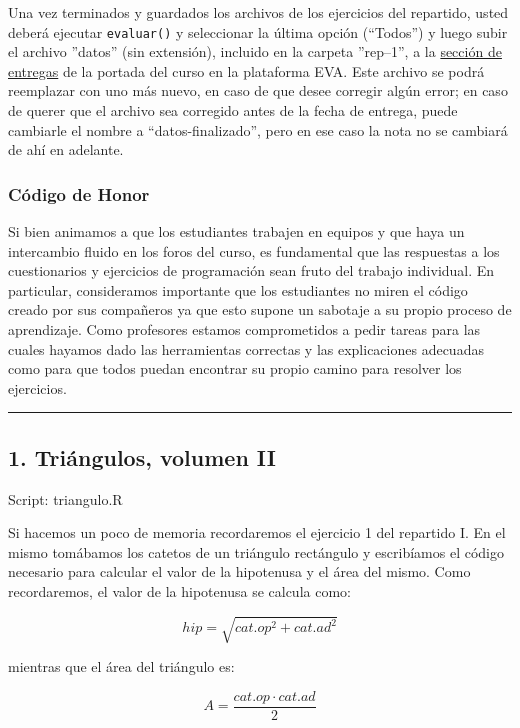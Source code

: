 \documentclass{article}
\begin{document}
Una vez terminados y guardados los archivos de los ejercicios del
repartido, usted deberá ejecutar \verb!evaluar()! y seleccionar la
última opción (``Todos'') y luego subir el archivo ''datos'' (sin
extensión), incluido en la carpeta ''rep--1'', a la
\href{http://eva.universidad.edu.uy/mod/assignment/view.php?id=95125}{sección
de entregas} de la portada del curso en la plataforma EVA. Este archivo
se podrá reemplazar con uno más nuevo, en caso de que desee corregir
algún error; en caso de querer que el archivo sea corregido antes de la
fecha de entrega, puede cambiarle el nombre a ``datos-finalizado'', pero
en ese caso la nota no se cambiará de ahí en adelante.

\subsubsection{Código de Honor}

Si bien animamos a que los estudiantes trabajen en equipos y que haya un
intercambio fluido en los foros del curso, es fundamental que las
respuestas a los cuestionarios y ejercicios de programación sean fruto
del trabajo individual. En particular, consideramos importante que los
estudiantes no miren el código creado por sus compañeros ya que esto
supone un sabotaje a su propio proceso de aprendizaje. Como profesores
estamos comprometidos a pedir tareas para las cuales hayamos dado las
herramientas correctas y las explicaciones adecuadas como para que todos
puedan encontrar su propio camino para resolver los ejercicios.

\begin{center}\rule{3in}{0.4pt}\end{center}

\subsection{1. Triángulos, volumen II}

Script: triangulo.R

Si hacemos un poco de memoria recordaremos el ejercicio 1 del repartido
I. En el mismo tomábamos los catetos de un triángulo rectángulo y
escribíamos el código necesario para calcular el valor de la hipotenusa
y el área del mismo. Como recordaremos, el valor de la hipotenusa se
calcula como:

\[
hip = \sqrt{cat.op ^ 2 + cat.ad ^ 2}
\]

mientras que el área del triángulo es:

\[
A = \frac{cat.op \cdot cat.ad}{2}
\]
\end{document}
